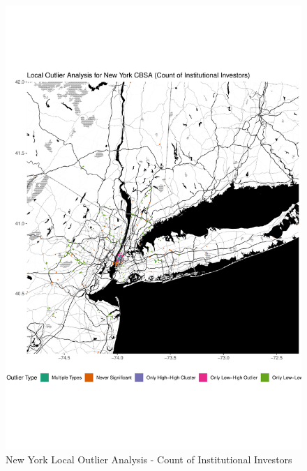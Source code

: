 \begin{figure}
	\centering
	\includegraphics[width=1\linewidth]{Figures/ChapterIV/NY_Count_LO}
	\caption[New York CBSA Local Outlier Analysis - Count of Institutional Investors 1999-2018]{New York Local Outlier Analysis - Count of Institutional Investors}
	\label{fig:NYCcountlocaloutliercount}
\end{figure}	

